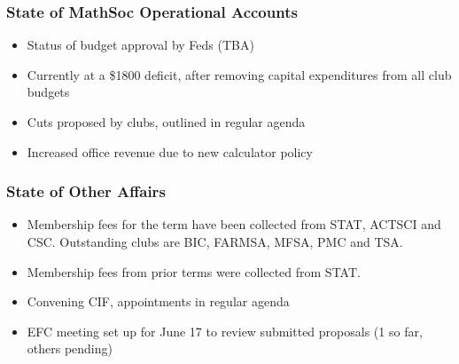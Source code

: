 \subsubsection*{State of MathSoc Operational Accounts}
\begin{itemize}
\item Status of budget approval by Feds (TBA)
\item Currently at a \$1800 deficit, after removing capital expenditures from all club budgets
\item Cuts proposed by clubs, outlined in regular agenda
\item Increased office revenue due to new calculator policy
\end{itemize}

\subsubsection*{State of Other Affairs}
\begin{itemize}
\item Membership fees for the term have been collected from STAT, ACTSCI and CSC. Outstanding clubs are BIC, FARMSA, MFSA, PMC and TSA. 
\item Membership fees from prior terms were collected from STAT.
\item Convening CIF, appointments in regular agenda
\item EFC meeting set up for June 17 to review submitted proposals (1 so far, others pending)
\end{itemize}

